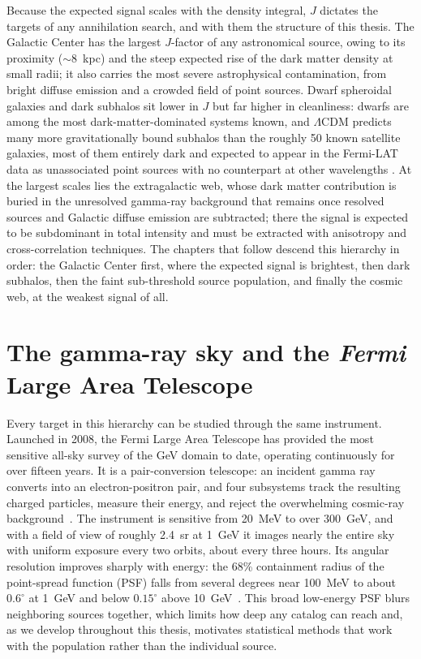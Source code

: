 Because the expected signal scales with the density integral, $J$ dictates the targets of any annihilation search, and with them the structure of this thesis. The Galactic Center has the largest $J$-factor of any astronomical source, owing to its proximity ($\sim 8$~kpc) and the steep expected rise of the dark matter density at small radii; it also carries the most severe astrophysical contamination, from bright diffuse emission and a crowded field of point sources. Dwarf spheroidal galaxies and dark subhalos sit lower in $J$ but far higher in cleanliness: dwarfs are among the most dark-matter-dominated systems known, and $\Lambda$CDM predicts many more gravitationally bound subhalos than the roughly 50 known satellite galaxies, most of them entirely dark and expected to appear in the Fermi-LAT data as unassociated point sources with no counterpart at other wavelengths \cite{Springel:2008cc}. At the largest scales lies the extragalactic web, whose dark matter contribution is buried in the unresolved gamma-ray background that remains once resolved sources and Galactic diffuse emission are subtracted; there the signal is expected to be subdominant in total intensity and must be extracted with anisotropy and cross-correlation techniques. The chapters that follow descend this hierarchy in order: the Galactic Center first, where the expected signal is brightest, then dark subhalos, then the faint sub-threshold source population, and finally the cosmic web, at the weakest signal of all.

\section*{The gamma-ray sky and the \textit{Fermi} Large Area Telescope}
Every target in this hierarchy can be studied through the same instrument. Launched in 2008, the Fermi Large Area Telescope has provided the most sensitive all-sky survey of the GeV domain to date, operating continuously for over fifteen years. It is a pair-conversion telescope: an incident gamma ray converts into an electron-positron pair, and four subsystems track the resulting charged particles, measure their energy, and reject the overwhelming cosmic-ray background~\cite{Atwood:2009ez}. The instrument is sensitive from 20~MeV to over 300~GeV, and with a field of view of roughly 2.4~sr at 1~GeV it images nearly the entire sky with uniform exposure every two orbits, about every three hours. Its angular resolution improves sharply with energy: the 68\% containment radius of the point-spread function (PSF) falls from several degrees near 100~MeV to about $0.6^\circ$ at 1~GeV and below $0.15^\circ$ above 10~GeV~\cite{Atwood:2009ez}. This broad low-energy PSF blurs neighboring sources together, which limits how deep any catalog can reach and, as we develop throughout this thesis, motivates statistical methods that work with the population rather than the individual source.

